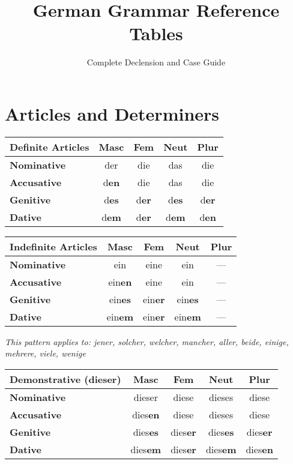 \documentclass[a4paper,20pt]{article}
\title{\textbf{German Grammar Reference Tables}}
\author{Complete Declension and Case Guide}
\date{}
\newcommand{\grammarending}[1]{\textbf{\textcolor{endingcolor}{#1}}}
\begin{document}
\maketitle
\thispagestyle{fancy}

\section{Articles and Determiners}

\begin{multicols}{2}
  \noindent
  \begin{tabular}{|l|c|c|c|c|}
  \hline
  \textbf{Definite Articles} & \textbf{Masc} & \textbf{Fem} & \textbf{Neut} & \textbf{Plur} \\
  \hline
  \textbf{Nominative} & der & die & das & die \\
  \hline
  \textbf{Accusative} & d\grammarending{en} & die & das & die \\
  \hline
  \textbf{Genitive} & d\grammarending{es} & d\grammarending{er} & d\grammarending{es} & d\grammarending{er} \\
  \hline
  \textbf{Dative} & d\grammarending{em} & d\grammarending{er} & d\grammarending{em} & d\grammarending{en} \\
  \hline
  \end{tabular}
  \begin{tabular}{|l|c|c|c|c|}
  \hline
  \textbf{Indefinite Articles} & \textbf{Masc} & \textbf{Fem} & \textbf{Neut} & \textbf{Plur} \\
  \hline
  \textbf{Nominative} & ein & eine & ein & --- \\
  \hline
  \textbf{Accusative} & ein\grammarending{en} & eine & ein & --- \\
  \hline
  \textbf{Genitive} & ein\grammarending{es} & ein\grammarending{er} & ein\grammarending{es} & --- \\
  \hline
  \textbf{Dative} & ein\grammarending{em} & ein\grammarending{er} & ein\grammarending{em} & --- \\
  \hline
  \end{tabular}
\end{multicols}

\textit{This pattern applies to: jener, solcher, welcher, mancher, aller, beide, einige, mehrere, viele, wenige}

\begin{center}
\begin{tabular}{|l|c|c|c|c|}
\hline
\textbf{Demonstrative (dieser)} & \textbf{Masc} & \textbf{Fem} & \textbf{Neut} & \textbf{Plur} \\
\hline
\textbf{Nominative} & dieser & diese & dieses & diese \\
\hline
\textbf{Accusative} & dies\grammarending{en} & diese & dieses & diese \\
\hline
\textbf{Genitive} & dies\grammarending{es} & dies\grammarending{er} & dies\grammarending{es} & dies\grammarending{er} \\
\hline
\textbf{Dative} & dies\grammarending{em} & dies\grammarending{er} & dies\grammarending{em} & dies\grammarending{en} \\
\hline
\end{tabular}
\end{center}
\end{document}
